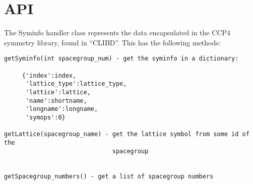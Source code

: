 \documentclass[a4paper, 11pt]{article}
\begin{document}
\section{API}

The Syminfo handler class represents the data encapsulated in the CCP4 
symmetry library, found in ``CLIBD''. This has the following methods:

{
\tiny
\begin{verbatim}
getSyminfo(int spacegroup_num) - get the syminfo in a dictionary:

     {'index':index,
      'lattice_type':lattice_type,
      'lattice':lattice,
      'name':shortname,
      'longname':longname,
      'symops':0}

getLattice(spacegroup_name) - get the lattice symbol from some id of the
                              spacegroup


getSpacegroup_numbers() - get a list of spacegroup numbers

\end{verbatim}
}
\end{document}
